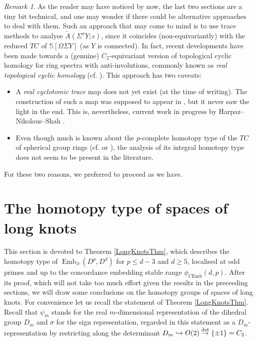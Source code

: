 \documentclass[a4paper, oneside]{amsart}
\newcommand{\emb}{\operatorname{Emb}}
\newcommand{\cemb}{C\mathrm{Emb}}
\newcommand{\1}{\mathds{1}}
\theoremstyle{remark}
\newtheorem{rem}[thm]{Remark}%
\theoremstyle{definition}
\newcommand{\s}{\mathbb{S}}
\numberwithin{equation}{section}
\begin{document}
\begin{rem}
    As the reader may have noticed by now, the last two sections are a tiny bit technical, and one may wonder if there could be alternative approaches to deal with them. Such an approach that may come to mind is to use trace methods to analyse $\widetilde{A}(\Sigma^\sigma Y;\epsilon)$, since it coincides (non-equivariantly) with the reduced $TC$ of $\s[\Omega\Sigma Y]$ (as $Y$ is connected). In fact, recent developments have been made towards a (genuine) $C_2$-equivariant version of topological cyclic homology for ring spectra with anti-involutions, commonly known as \textit{real topological cyclic homology} (cf. \cite{HøgenhavenRealTC, RealKtheoryHessMads,DottoMoiPatchkoria}). This approach has two caveats:
    \begin{itemize}
        \item A \textit{real cyclotomic trace} map does not yet exist (at the time of writing). The construction of such a map was supposed to appear in \cite{RealKtheoryHessMads}, but it never saw the light in the end. This is, nevertheless, current work in progress by Harpaz--Nikolaus--Shah \cite[p. 24]{RealCycTraceMap}.

        \item Even though much is known about the $p$-complete homotopy type of the $TC$ of spherical group rings (cf. \cite{AvsTC} or \cite[\S 4.3]{NikolausScholze}), the analysis of its integral homotopy type does not seem to be present in the literature.
    \end{itemize}
    For these two reasons, we preferred to proceed as we have. 
\end{rem}



























\section{The homotopy type of spaces of long knots}\label{longknotsection}

This section is devoted to Theorem \ref{LongKnotsThm}, which describes the homotopy type of $\emb_\partial(D^p,D^d)$ for $p\leq d-3$ and $d\geq 5$, localised at odd primes and up to the concordance embedding stable range $\phi_{\cemb}(d,p)$. After its proof, which will not take too much effort given the results in the preceeding sections, we will draw some conclusions on the homotopy groups of spaces of long knots. For convenience let us recall the statement of Theorem \ref{LongKnotsThm}. Recall that $\psi_m$ stands for the real $m$-dimensional representation of the dihedral group $D_m$ and $\sigma$ for the sign representation, regarded in this statement as a $D_m$-representation by restricting along the determinant $D_m\xhookrightarrow{}O(2)\overset\det\to \{\pm 1\}= C_2$.
\end{document}
